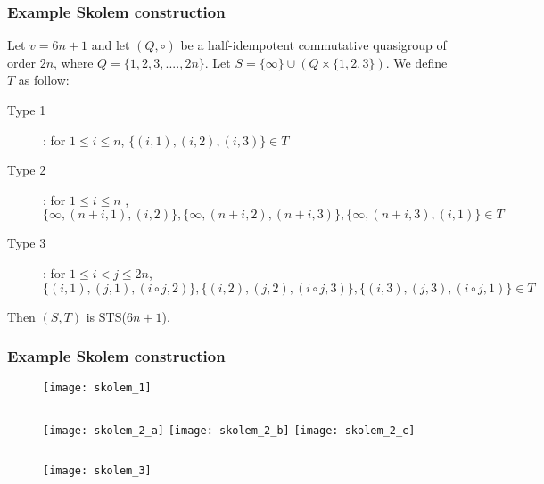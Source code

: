 \begin{frame}
\frametitle{Example Skolem construction}
Let $v = 6n +1$ and let $(Q, \circ)$ be a half-idempotent commutative quasigroup of order $2n$, where $Q = \{ 1,2,3,...., 2n\}$. Let $S = \{\infty\} \cup(Q \times \{1,2,3\})$. We define $T$ as follow:

\begin{description}
	\item[Type 1]: for $1 \le i \le n$, $\{ (i,1), (i,2), (i,3) \} \in T$ 
	\item[Type 2]: for $1 \le i \le n$ , $\{ \infty, (n+i,1),(i,2) \},\{ \infty, (n+i,2),(n+i,3) \},\{\infty,(n+i,3),(i,1) \} \in T$
	\item[Type 3]: for $1 \le i < j \le 2n$,$\{(i,1),(j,1),(i \circ j,2) \}, \{(i,2),(j,2),(i \circ j,3)\},\{(i,3),(j,3),(i\circ j,1)\} \in T$
\end{description}

Then $(S,T)$ is STS($6n+1$). 
\end{frame}

\begin{frame}
\frametitle{Example Skolem construction}
\begin{figure}
	\texttt{[image: skolem\_1]}
	\begin{columns}
		\texttt{[image: skolem\_2\_a]}
		\texttt{[image: skolem\_2\_b]}
		\texttt{[image: skolem\_2\_c]}
	\end{columns}
	\texttt{[image: skolem\_3]}
\end{figure}
\end{frame}


